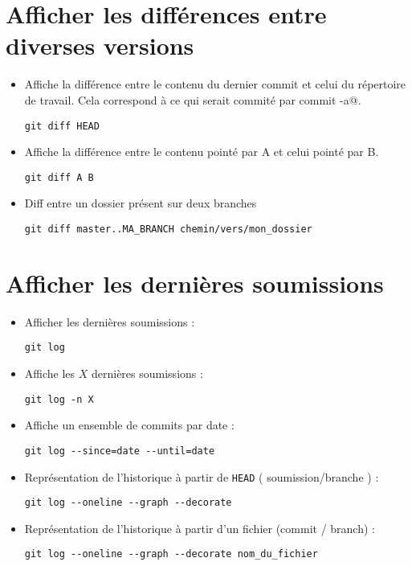 \documentclass[fleqn,11pt]{article}
\begin{document}
\section{Afficher les différences entre diverses versions}

\begin{itemize}
\item Affiche la différence entre le contenu du dernier commit et celui du répertoire de travail. Cela correspond à ce qui serait commité par 
\lstinline@git commit -a@.
\begin{lstlisting}
git diff HEAD
\end{lstlisting}
\item Affiche la différence entre le contenu pointé par A et celui pointé par B.
\begin{lstlisting}
git diff A B
\end{lstlisting}
\item Diff entre un dossier présent sur deux branches
\begin{lstlisting}
git diff master..MA_BRANCH chemin/vers/mon_dossier
\end{lstlisting}
\end{itemize}

\section{Afficher les dernières soumissions}

\begin{itemize}
\item Afficher les dernières soumissions :
\begin{lstlisting}
git log
\end{lstlisting}
\item Affiche les $X$ dernières soumissions  :
\begin{lstlisting}
git log -n X
\end{lstlisting}
\item Affiche un ensemble de commits par date :
\begin{lstlisting}
git log --since=date --until=date
\end{lstlisting}
\item Représentation de l'historique à partir de \texttt{HEAD} ( soumission/branche ) :
\begin{lstlisting}
git log --oneline --graph --decorate
\end{lstlisting}
\item Représentation de l’historique à partir d'un fichier (commit / branch) :
\begin{lstlisting}
git log --oneline --graph --decorate nom_du_fichier
\end{lstlisting}
\end{itemize}
\end{document}
